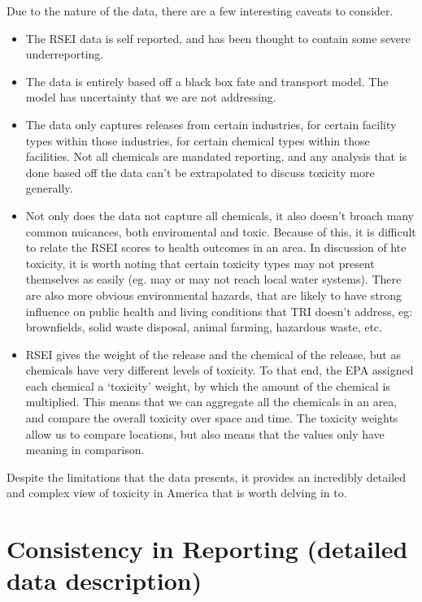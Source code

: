 \documentclass[12pt,twoside]{dukestatscithesis}
\theoremstyle{definition}
\theoremstyle{definition}
\theoremstyle{definition}
\theoremstyle{remark}
\begin{document}
Due to the nature of the data, there are a few interesting caveats to
consider.
\begin{itemize}
\item
  The RSEI data is self reported, and has been thought to contain some
  severe underreporting.
\item
  The data is entirely based off a black box fate and transport model.
  The model has uncertainty that we are not addressing.
\item
  The data only captures releases from certain industries, for certain
  facility types within those industries, for certain chemical types
  within those facilities. Not all chemicals are mandated reporting, and
  any analysis that is done based off the data can't be extrapolated to
  discuss toxicity more generally.
\item
  Not only does the data not capture all chemicals, it also doesn't
  broach many common nuicances, both enviromental and toxic. Because of
  this, it is difficult to relate the RSEI scores to health outcomes in
  an area. In discussion of hte toxicity, it is worth noting that
  certain toxicity types may not present themselves as easily (eg. may
  or may not reach local water systems). There are also more obvious
  environmental hazards, that are likely to have strong influence on
  public health and living conditions that TRI doesn't address, eg:
  brownfields, solid waste disposal, animal farming, hazardous waste,
  etc.
\item
  RSEI gives the weight of the release and the chemical of the release,
  but as chemicals have very different levels of toxicity. To that end,
  the EPA assigned each chemical a `toxicity' weight, by which the
  amount of the chemical is multiplied. This means that we can aggregate
  all the chemicals in an area, and compare the overall toxicity over
  space and time. The toxicity weights allow us to compare locations,
  but also means that the values only have meaning in comparison.
\end{itemize}
Despite the limitations that the data presents, it provides an
incredibly detailed and complex view of toxicity in America that is
worth delving in to.

\section{Consistency in Reporting (detailed data
description)}\label{consistency-in-reporting-detailed-data-description}
\end{document}
